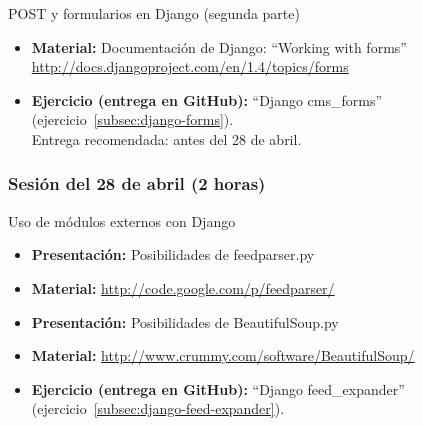 \documentclass[a4paper,12pt]{article}
\begin{document}
POST y formularios en Django (segunda parte)

\begin{itemize}

    \item \textbf{Material:} Documentación de Django: ``Working with forms'' \\
      \url{http://docs.djangoproject.com/en/1.4/topics/forms}
    \item \textbf{Ejercicio (entrega en GitHub):} ``Django cms\_forms'' (ejercicio~\ref{subsec:django-forms}). \\
  Entrega recomendada: antes del 28 de abril.
\end{itemize}

\subsubsection{Sesión del 28 de abril (2 horas)}

Uso de módulos externos con Django

\begin{itemize}
  \item \textbf{Presentación:} Posibilidades de feedparser.py
  \item \textbf{Material:} \url{http://code.google.com/p/feedparser/}
  \item \textbf{Presentación:} Posibilidades de BeautifulSoup.py
  \item \textbf{Material:} \url{http://www.crummy.com/software/BeautifulSoup/}
  \item \textbf{Ejercicio (entrega en GitHub):} ``Django feed\_expander'' (ejercicio~\ref{subsec:django-feed-expander}).
\end{itemize}

%
%

%
%
%
\end{document}
